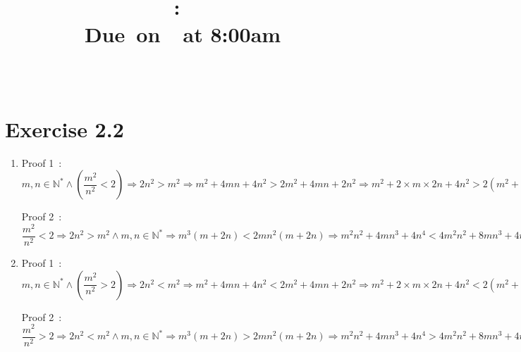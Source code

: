 \documentclass{article}
\title{
    \vspace{2in}
    \textmd{\textbf{\hmwkClass:\ \hmwkTitle}}\\
    \normalsize\vspace{0.1in}\small{Due\ on\ \hmwkDueDate\ at 8:00am}\\
    \vspace{0.1in}\large{\textit{\hmwkClassInstructor\ \hmwkClassTime}}
    \vspace{3in}
}
\author{\textbf{\hmwkAuthorName}}
\date{}
\begin{document}
\maketitle

\pagebreak



\section{Exercise 2.2}
\begin{enumerate}
    \item Proof 1\ :  $ m,n\in \mathbb{N}^*  \wedge (\dfrac{m^2}{n^2}<2)\Rightarrow
     2n^2>m^2 \Rightarrow 
     m^2+4mn+4n^2>2m^2+4mn+2n^2 \Rightarrow 
     m^2+2\times m\times 2n+4n^2>2(m^2+2mn+n^2) \Rightarrow
      (m+2n)^2 >2(m+n)^2 \Rightarrow 
      \dfrac{(m+2n)^2}{(m+n)^2}>2 $
    
    Proof 2\ : $ \dfrac{m^2}{n^2}<2\Rightarrow   
    2n^2>m^2 \wedge m,n\in \mathbb{N}^*	\Rightarrow	
    m^3(m+2n)<2mn^2(m+2n)	\Rightarrow
    m^2n^2+4mn^3+4n^4<4m^2n^2+8mn^3+4n^4-m^4-2m^3n-m^2n^2	\wedge n\neq 0 \Rightarrow
    m^2+4mn+4n^2<\frac{\left(m^2+2 m n+n^2\right) \left(4 n^2-m^2\right)}{n^2} \wedge (m,n\in \mathbb{N}^* )	\Rightarrow	
    \frac{(m+2 n)^2}{(m+n)^2}<4-\frac{m^2}{n^2} \Rightarrow
    \frac{(m+2 n)^2}{(m+n)^2}-2<2-\frac{m^2}{n^2}
    							$
    							
    \item Proof 1\ :  $ m,n\in \mathbb{N}^*  \wedge (\dfrac{m^2}{n^2}>2)\Rightarrow
    2n^2<m^2 \Rightarrow 
    m^2+4mn+4n^2<2m^2+4mn+2n^2 \Rightarrow 
    m^2+2\times m\times 2n+4n^2<2(m^2+2mn+n^2) \Rightarrow
    (m+2n)^2 <2(m+n)^2 \Rightarrow 
    \dfrac{(m+2n)^2}{(m+n)^2}<2 $
    
    Proof 2\ : $ \dfrac{m^2}{n^2}>2\Rightarrow   
    2n^2<m^2 \wedge m,n\in \mathbb{N}^*	\Rightarrow	
    m^3(m+2n)>2mn^2(m+2n)	\Rightarrow
    m^2n^2+4mn^3+4n^4>4m^2n^2+8mn^3+4n^4-m^4-2m^3n-m^2n^2	\wedge n\neq 0 \Rightarrow
    m^2+4mn+4n^2>\frac{\left(m^2+2 m n+n^2\right) \left(4 n^2-m^2\right)}{n^2} \wedge (m,n\in \mathbb{N}^* )	\Rightarrow	
    \frac{(m+2 n)^2}{(m+n)^2}>4-\frac{m^2}{n^2} \Rightarrow
    \frac{(m+2 n)^2}{(m+n)^2}-2>2-\frac{m^2}{n^2}
    $							
    							

\end{enumerate}
\end{document}
